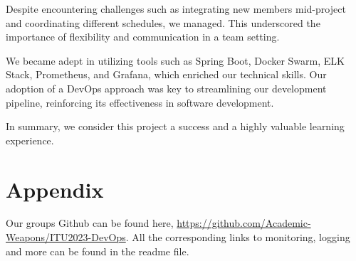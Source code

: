 Despite encountering challenges such as integrating new members mid-project and coordinating different schedules, we managed. This underscored the importance of flexibility and communication in a team setting.

We became adept in utilizing tools such as Spring Boot, Docker Swarm, ELK Stack, Prometheus, and Grafana, which enriched our technical skills. Our adoption of a DevOps approach was key to streamlining our development pipeline, reinforcing its effectiveness in software development.

In summary, we consider this project a success and a highly valuable learning experience.  


\section{Appendix}
Our groups Github can be found here, \href{https://github.com/Academic-Weapons/ITU2023-DevOps}{https://github.com/Academic-Weapons/ITU2023-DevOps}. All the corresponding links to monitoring, logging and more can be found in the readme file. 